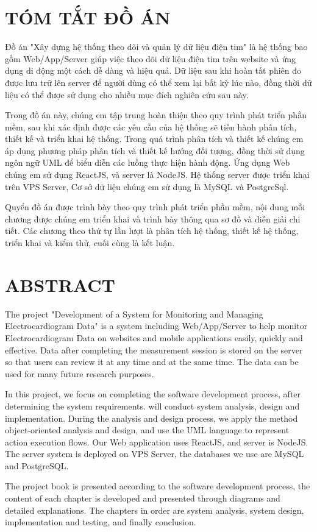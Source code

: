 \section*{TÓM TẮT ĐỒ ÁN}

Đồ án "Xây dựng hệ thống theo dõi và quản lý dữ liệu điện tim" là hệ thống bao gồm Web/App/Server giúp việc theo dõi dữ liệu điện tim trên website và ứng dụng di động một cách dễ dàng và
hiệu quả. Dữ liệu sau khi hoàn tất phiên đo được lưu trữ lên server để người dùng có thể xem lại bất kỳ lúc nào, đồng thời
dữ liệu có thể được sử dụng cho nhiều mục đích nghiên cứu sau này.

Trong đồ án này, chúng em tập trung hoàn thiện theo quy trình phát triển phần mềm, sau khi xác định được các yêu cầu của hệ thống
sẽ tiến hành phân tích, thiết kế và triển khai hệ thống. Trong quá trình phân tích và thiết kế chúng em áp dụng phương pháp
phân tích và thiết kế hướng đối tượng, đồng thời sử dụng ngôn ngữ UML để biểu diễn các luồng thực hiện hành động. Ứng dụng Web chúng em sử dụng ReactJS, và server
là NodeJS. Hệ thống server được triển khai trên VPS Server, Cơ sở dữ liệu chúng em sử dụng là MySQL và PostgreSql.

Quyển đồ án được trình bày theo quy trình phát triển phần mềm, nội dung mỗi chương được chúng em triển khai và trình bày thông qua sơ đồ và diễn giải chi tiết. 
Các chương theo thứ tự lần lượt là phân tích hệ thống, thiết kế hệ thống, triển khai và kiểm thử, cuối cùng là kết luận.


\newpage
\section*{ABSTRACT}

The project "Development of a System for Monitoring and Managing Electrocardiogram Data" is a system including Web/App/Server to help monitor Electrocardiogram Data on websites and mobile applications easily, quickly and effective. Data after completing the measurement session is stored on the server so that users can review it at any time and at the same time. The data can be used for many future research purposes.

In this project, we focus on completing the software development process, after determining the system requirements.
will conduct system analysis, design and implementation. During the analysis and design process, we apply the method
object-oriented analysis and design, and use the UML language to represent action execution flows. Our Web application uses ReactJS, and server
is NodeJS. The server system is deployed on VPS Server, the databases we use are MySQL and PostgreSQL.

The project book is presented according to the software development process, the content of each chapter is developed and presented through diagrams and detailed explanations.
The chapters in order are system analysis, system design, implementation and testing, and finally conclusion.

\cleardoublepage



